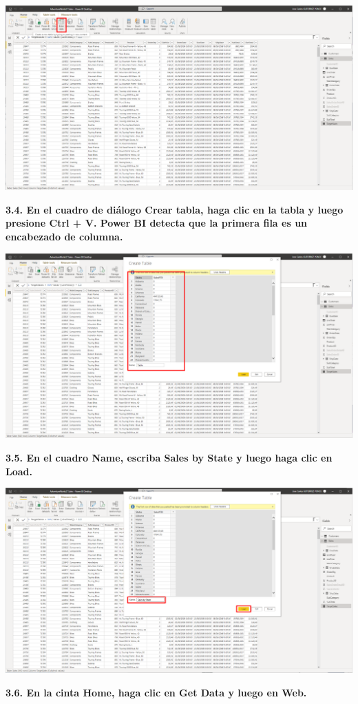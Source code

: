 \documentclass{article}
\begin{document}
    \begin{center}
		\includegraphics[width=14cm]{./images/50} 
	\end{center}
\newpage
\textbf{3.4. En el cuadro de diálogo Crear tabla, haga clic en la tabla y luego presione Ctrl + V. Power BI detecta que la primera fila es un encabezado de columna.}

    \begin{center}
		\includegraphics[width=14cm]{./images/51} 
	\end{center}

\textbf{3.5. En el cuadro \textbf{Name}, escriba \textbf{Sales by State} y luego haga clic en \textbf{Load}.}

    \begin{center}
		\includegraphics[width=14cm]{./images/52} 
	\end{center}
\newpage
\textbf{3.6. En la cinta \textbf{Home}, haga clic en \textbf{Get Data} y luego en \textbf{Web}.}
\end{document}
